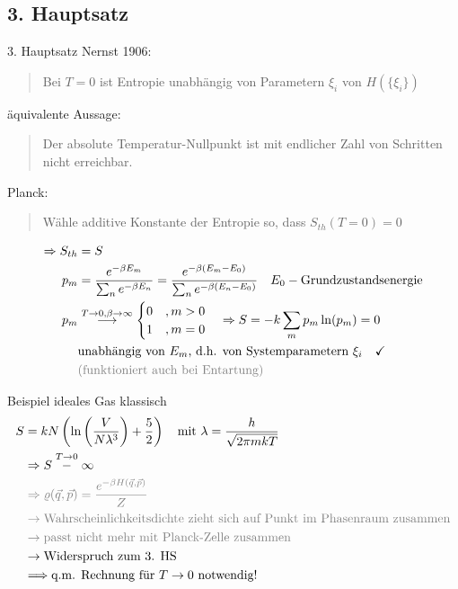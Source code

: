 \subsection{3. Hauptsatz}
\begin{definition}{3. Hauptsatz}
    Nernst 1906:
    \begin{quote}
        Bei $T=0$ ist Entropie unabhängig von Parametern $\xi_i$ von $H(\{\xi_i\})$
    \end{quote}
    äquivalente Aussage:
    \begin{quote}
        Der absolute Temperatur-Nullpunkt ist mit endlicher Zahl von Schritten nicht erreichbar.
    \end{quote}
    Planck:
    \begin{quote}
    Wähle additive Konstante der Entropie so, dass $S_{th}(T=0) = 0$
    \end{quote}
    \begin{align}
        \Rightarrow S_{th} &= S \\
        p_m &= \frac{e^{-\beta E_m}}{\sum_n e^{-\beta E_n}} = \frac{e^{-\beta (E_m-E_0)}}{\sum_n e^{-\beta (E_n-E_0)}} \quad E_0 - \text{Grundzustandsenergie}\\
        p_m &\stackrel{T \to 0, \beta \to \infty}{\longrightarrow} \begin{cases}
            0 \quad, m > 0 \\ 1 \quad, m = 0
        \end{cases} \Rightarrow S = - k \sum_m p_m \ln(p_m) = 0 \\
        &\text{unabhängig von $E_m$, d.h. von Systemparametern $\xi_i$} \quad \checkmark \\
        &\text{\color{black!50} (funktioniert auch bei Entartung)}
    \end{align}
\end{definition}

\begin{beispiel}{Beispiel ideales Gas klassisch}
    \begin{align}
        S &= kN \left( \ln\left(\frac{V}{N \lambda^3}\right) + \frac{5}{2}\right) \quad \text{mit } \lambda = \frac{h}{\sqrt{2 \pi m k T}} \\
        &\Rightarrow S \stackrel{T\to 0} - \infty \\
        &\color{black!50} \Rightarrow \varrho(\Vec{q},\Vec{p}) = \frac{e^{-\beta H(\Vec{q},\Vec{p})}}{Z}\\
        &\color{black!50} \rightarrow \text{Wahrscheinlichkeitsdichte zieht sich auf Punkt im Phasenraum zusammen}\\
        &\color{black!50} \rightarrow \text{passt nicht mehr mit Planck-Zelle zusammen}\\
        &\rightarrow \text{Widerspruch zum 3. HS}\\
        &\Longrightarrow \text{q.m. Rechnung für $T\to 0$ notwendig!}
    \end{align}
\end{beispiel}

